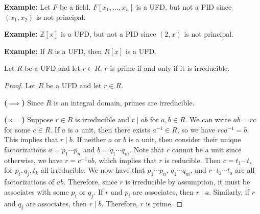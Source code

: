 \documentclass [12pt] {article}
\newcommand{\Z}{\mathbb{Z}}
\newenvironment{theorem}[1]{\begin{tcolorbox}[title={Theorem #1},colback=green!5!white,colframe=black!75!green]}{\end{tcolorbox}}
\renewcommand{\bf}[1]{\textbf{{#1}}}
\begin{document}
\bf{Example:} Let $F$ be a field. $F[x_1, \ldots, x_n]$ is a UFD, but not a PID since $(x_1, x_2)$
is not principal.
\vspace{1em}

\bf{Example:} $\Z[x]$ is a UFD, but not a PID since $(2, x)$ is not principal.
\vspace{1em}

\bf{Example:} If $R$ is a UFD, then $R[x]$ is a UFD.

\newpage
\begin{theorem}{}
    Let $R$ be a UFD and let $r \in R$. $r$ is prime if and only if it is irreducible.
\end{theorem}
\begin{proof}
    Let $R$ be a UFD and let $r \in R$.
    \vspace{0.5em}

    \bf{($\bm{\implies}$)}
    Since $R$ is an integral domain, primes are irreducible.
    \vspace{0.5em}

    \bf{($\bm{\impliedby}$)}
    Suppose $r \in R$ is irreducible and $r \mid ab$ for $a, b \in R$. We can write $ab = rc$ for
    some $c \in R$. If $a$ is a unit, then there exists $a^{-1} \in R$, so we have $rca^{-1} = b$.
    This implies that $r \mid b$. If neither $a$ or $b$ is a unit, then consider their unique
    factorizations $a = p_1 \cdots p_n$ and $b = q_1 \cdots q_m$. Note that $c$ cannot be a unit
    since otherwise, we have $r = c^{-1}ab$, which implies that $r$ is reducible. Then
    $c = t_1 \cdots t_s$ for $p_i, q_j, t_k$ all irreducible. We now have that $p_1 \cdots p_n$,
    $q_1 \cdots q_m$, and $r \cdot t_1 \cdots t_s$ are all factorizations of $ab$. Therefore, since
    $r$ is irreducible by assumption, it must be associates with some $p_i$ or $q_j$. If $r$ and
    $p_i$ are associates, then $r \mid a$. Similarly, if $r$ and $q_j$ are associates, then
    $r \mid b$. Therefore, $r$ is prime.
    \vspace{0.5em}
\end{proof}
\end{document}
